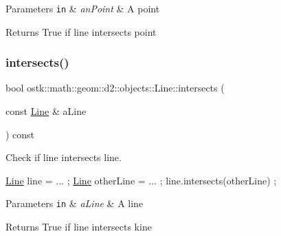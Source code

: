 \begin{DoxyParams}[1]{Parameters}
\mbox{\tt in}  & {\em an\+Point} & A point \\
\hline
\end{DoxyParams}
\begin{DoxyReturn}{Returns}
True if line intersects point 
\end{DoxyReturn}
\mbox{\label{classostk_1_1math_1_1geom_1_1d2_1_1objects_1_1_line_af5918581cbbe8fdd5443bffbbffa5c41}} 
\subsubsection{\texorpdfstring{intersects()}{intersects()}\hspace{0.1cm}{\footnotesize\ttfamily [2/2]}}
{\footnotesize\ttfamily bool ostk\+::math\+::geom\+::d2\+::objects\+::\+Line\+::intersects (\begin{DoxyParamCaption}\item[{const \hyperlink{classostk_1_1math_1_1geom_1_1d2_1_1objects_1_1_line}{Line} \&}]{a\+Line }\end{DoxyParamCaption}) const}



Check if line intersects line. 


\begin{DoxyCode}
\hyperlink{classostk_1_1math_1_1geom_1_1d2_1_1objects_1_1_line_aa1570ebec4d4f57cbed3c188e6b65613}{Line} line = ... ;
\hyperlink{classostk_1_1math_1_1geom_1_1d2_1_1objects_1_1_line_aa1570ebec4d4f57cbed3c188e6b65613}{Line} otherLine = ... ;
line.intersects(otherLine) ;
\end{DoxyCode}



\begin{DoxyParams}[1]{Parameters}
\mbox{\tt in}  & {\em a\+Line} & A line \\
\hline
\end{DoxyParams}
\begin{DoxyReturn}{Returns}
True if line intersects kine 
\end{DoxyReturn}
\mbox{\label{classostk_1_1math_1_1geom_1_1d2_1_1objects_1_1_line_a1e2a44eac16df2d9009eebf3aa85afd2}} 
